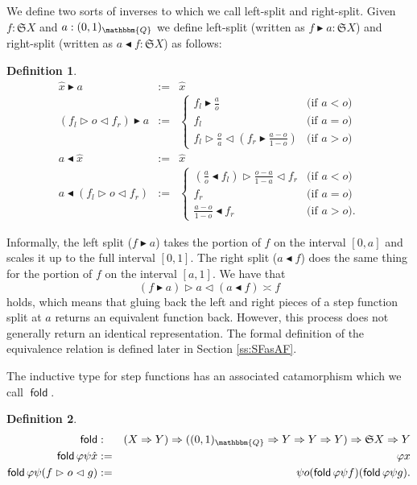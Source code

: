 \documentclass{elsarticle}
\newcommand{\assign}{:=}
\newcommand{\tmop}[1]{\ensuremath{\operatorname{#1}}}
\newcommand{\tmtextsf}[1]{{\sffamily{#1}}}
\newtheorem{definition}{Definition}
\newcommand{\defEq}{\ensuremath{\assign}}
\newcommand{\pure}[1]{\ensuremath{\widehat{#1}}}
\newcommand{\SF}{\ensuremath{\mathfrak{S}}}
\newcommand{\glue}[3]{\ensuremath{#1 \vartriangleright #2 \vartriangleleft #3}}
\newcommand{\splitl}[2]{\ensuremath{#1 \blacktriangleright #2}}
\newcommand{\splitr}[2]{\ensuremath{#2 \blacktriangleleft #1}}
\newcommand{\ou}{\ensuremath{(0,1)_{\mathbbm{Q}}}}
\begin{document}
We define two sorts of inverses to \tmtextsf{glue} which we call
left-split and
right-split. Given $f : \mathfrak{S}X$ and $a : \ou$ we define left-split
(written as $\splitl{f}{a} : \mathfrak{S}X$) and right-split
(written as $\splitr{f}{a} : \mathfrak{S}X$) as follows:

\begin{definition}
  \begin{eqnarray*}
    \text{$\splitl{\pure{x}}{a}$} & \defEq & \pure{x}\\
    \splitl{( \glue{f_l}{o}{f_r})}{a} & \defEq & \left\{\begin{array}{ll}
      \splitl{f_l}{\frac{a}{o}}  & \text{(if $a < o$)}\\
      f_l & \text{(if $a = o$)}\\
      \glue{f_l}{\frac{o}{a}}{\splitl{(f_r}{\frac{a - o}{1 - o})}} & \text{(if
      $a > o$)}
    \end{array}\right.\\
    \splitr{\pure{x}}{a} & \defEq & \pure{x}\\
    \splitr{( \glue{f_l}{o}{f_r})}{a} & \defEq & \left\{\begin{array}{ll}
      \glue{( \splitr{f_l}{\frac{a}{o}})}{\frac{o - a}{1 - a}}{f_r}  &
      \text{(if $a < o$)}\\
      f_r & \text{(if $a = o$)}\\
      \splitr{f_r}{\frac{a - o}{1 - o}} & \text{(if $a > o$)} \text{.}
    \end{array}\right.
  \end{eqnarray*}
\end{definition}

Informally, the left split ({\splitl{f}{a}}) takes the portion of $f$ on the
interval $[0,a]$ and scales it up to the full interval $[0,1]$. The right
split ({\splitr{f}{a}}) does the same thing for the portion of $f$ on the
interval $[a,1]$. We have that
\[\glue{\splitl{(f}{a)}}{a}{\splitr{f)}{(a}\asymp f}\]
holds, which means that gluing back the left and right pieces of a
step function split at $a$ returns an equivalent function back. However, this
process does not generally return an identical representation. The formal
definition of the equivalence relation is defined later in Section
\ref{ss:SFasAF}.

The inductive type for step functions has an associated catamorphism which we
call $\tmop{\mathsf{fold}}$.

\begin{definition}
  \begin{eqnarray*}
    \tmop{\mathsf{fold}} & : & (X \Rightarrow Y) \Rightarrow ( \ou \Rightarrow
    Y \Rightarrow Y \Rightarrow Y) \Rightarrow \SF X \Rightarrow Y\\
    \tmop{\mathsf{fold}} \varphi \psi \hat{x} & \assign & \varphi x\\
    \tmop{\mathsf{fold}} \varphi \psi ( \glue{f}{o}{g}) & \assign & \psi o (
    \tmop{\mathsf{fold}} \varphi \psi f) ( \tmop{\mathsf{fold}} \varphi \psi
    g) \text{.}
  \end{eqnarray*}
\end{definition}
\end{document}
